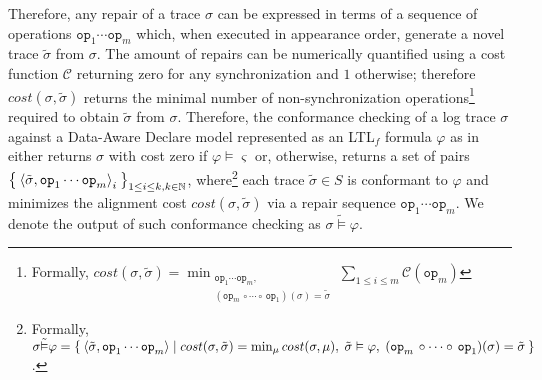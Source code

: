 Therefore, any repair  of a trace $\sigma$ can be expressed in terms of a sequence of operations $\texttt{op}_1\cdots \texttt{op}_m$ which, when executed in appearance order, generate a novel trace $\tilde{\sigma}$ from $\sigma$. The amount of repairs can be numerically quantified using a cost function $\mathcal{C}$ returning zero for any synchronization and $1$ otherwise; therefore $cost(\sigma, \tilde{\sigma})$ returns the minimal number of non-synchronization operations\footnote{Formally, $cost(\sigma,\tilde{\sigma})=\min_{\substack{\texttt{op}_1\cdots \texttt{op}_m,\\(\texttt{op}_m\,\circ \cdots\circ\, \texttt{op}_1)(\sigma)=\tilde{\sigma}}}\sum_{1\leq i\leq m}\mathcal{C}(\texttt{op}_m)$} required to obtain $\tilde{\sigma}$ from $\sigma$. Therefore, the conformance checking of a log trace $\sigma$ against a Data-Aware Declare model represented as an LTL$_f$ formula $\varphi$ as in \cite{XuLZ17a} either returns $\sigma$ with cost zero if $\varphi\vDash\varsigma$ or, otherwise, returns a set of pairs $\Set{\braket{\tilde{\sigma},\texttt{op}_1\cdots\texttt{op}_m}_i}_{1\leq i\leq k, k\in\mathbb{N}}$, where\footnote{Formally, $\sigma\tilde{\vDash}\varphi = \Set{\braket{\tilde{\sigma},\texttt{op}_1\cdots\texttt{op}_m} | cost(\sigma,\tilde{\sigma}) = \min_\mu cost(\sigma,\mu),\;\tilde{\sigma}\vDash\varphi,\; (\texttt{op}_m\,\circ \cdots\circ\, \texttt{op}_1)(\sigma)=\tilde{\sigma}}$.} each trace $\tilde{\sigma}\in S$ is conformant to $\varphi$ and minimizes the alignment cost $cost(\sigma,\tilde{\sigma})$ via a repair sequence $\texttt{op}_1\cdots\texttt{op}_m$. We denote the output of such conformance checking as $\sigma\tilde{\vDash}\varphi$. 



